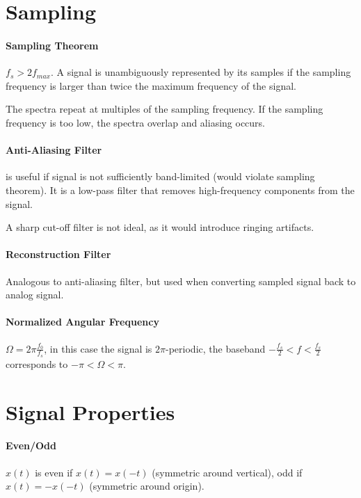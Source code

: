 \documentclass{article}
\begin{document}
\begin{multicols}{2}

    \section*{Sampling}

    \paragraph{Sampling Theorem} $f_s > 2f_{max}$. A signal is unambiguously represented by its samples if the sampling frequency is larger than twice the maximum frequency of the signal.

    The spectra repeat at multiples of the sampling frequency. If the sampling frequency is too low, the spectra overlap and aliasing occurs.

    \paragraph{Anti-Aliasing Filter} is useful if signal is not sufficiently band-limited (would violate sampling theorem). It is a low-pass filter that removes high-frequency components from the signal.

    A sharp cut-off filter is not ideal, as it would introduce ringing artifacts.

    \paragraph{Reconstruction Filter} Analogous to anti-aliasing filter, but used when converting sampled signal back to analog signal.

    \paragraph{Normalized Angular Frequency} $\Omega = 2\pi \frac{f_0}{f_s}$, in this case the signal is $2\pi$-periodic, the baseband $-\frac{f_s}{2} < f < \frac{f_s}{2}$ corresponds to $-\pi < \Omega < \pi$.

    \section*{Signal Properties}

    \paragraph{Even/Odd} $x(t)$ is even if $x(t) = x(-t)$ (symmetric around vertical), odd if $x(t) = -x(-t)$ (symmetric around origin).


\end{multicols}
\end{document}
